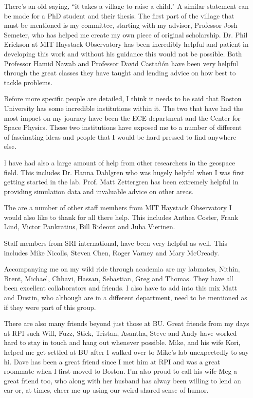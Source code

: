 There's an old saying, ``it takes a village to raise a child." A similar statement can be made for a PhD student and their thesis. The first part of the village that must be mentioned is my committee, starting with my advisor, Professor Josh Semeter, who has helped me create my own piece of original scholarship. Dr. Phil Erickson at MIT Haystack Observatory has been incredibly helpful and patient in developing this work and without his guidance this would not be possible. Both Professor Hamid Nawab and Professor David Castañón have been very helpful through the great classes they have taught and lending advice on how best to tackle problems.

Before more specific people are detailed, I think it needs to be said that Boston University has some incredible institutions within it. The two that have had the most impact on my journey have been the ECE department and the Center for Space Physics. These two institutions have exposed me to a number of different of fascinating ideas and people that I would be hard pressed to find anywhere else.

I have had also a large amount of help from other researchers in the geospace field. This includes Dr. Hanna Dahlgren who was hugely helpful when I was first getting started in the lab. Prof. Matt Zettergren has been extremely helpful in providing simulation data and invaluable advice on other areas.

The are a number of other staff members from MIT Haystack Observatory I would also like to thank for all there help. This includes Anthea Coster, Frank Lind, Victor Pankratius, Bill Rideout and Juha Vierinen. 

Staff members from SRI international, have been very helpful as well. This includes Mike Nicolls, Steven Chen, Roger Varney and Mary McCready.
 
Accompanying me on my wild ride through academia are my labmates, Nithin, Brent, Michael, Chhavi, Hassan, Sebastian, Greg and Thomas. They have all been excellent collaborators and friends. I also have to add into this mix Matt and Dustin, who although are in a different department, need to be mentioned as if they were part of this group.

There are also many friends beyond just those at BU. Great friends from my days at RPI such Will, Fuzz, Stick, Tristan, Asantha, Steve and Andy have worked hard to stay in touch and hang out whenever possible. Mike, and his wife Kori, helped me get settled at BU after I walked over to Mike's lab unexpectedly to say hi. Dave has been a great friend since I met him at RPI and was a great roommate when I first moved to Boston. I'm also proud to call his wife Meg a great friend too, who along with her husband has alway been willing to lend an ear or, at times, cheer me up using our weird shared sense of humor.

